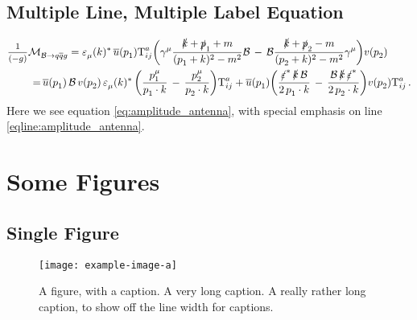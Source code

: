 \subsection{Multiple Line, Multiple Label Equation}

\begin{subequations} \begin{align}
		\mfrac{1}{(-g)} \mathcal{M}&\sub{\mathcal{B} \rightarrow q\overline{q}g }
		=
		\varepsilon\sub{\mu}(k)\upp{*} \,
		\overline{u}(p\sub{1})
		\textrm{T}\ind{a}{ij}
		\bigg(
		\gamma\upp{\mu}
		\frac{ \slashed{k} + \slashed{p}\sub{1} + m }{ (p\sub{1} + k)\upp{2} - m\upp{2} }
		\mathcal{B}
		\,-\,
		\mathcal{B}
		\frac{ \slashed{k} + \slashed{p}\sub{2} - m }{ (p\sub{2} + k)\upp{2} - m\upp{2} }
		\gamma\upp{\mu}
		\bigg)
		v(p\sub{2})
		\\
		=&\,
		\overline{u}(p\sub{1})
		\, \mathcal{B} \,
		v(p\sub{2}) \,
		\varepsilon\sub{\mu}(k)\upp{*} \,
		\bigg(
		\frac{ p\ind{\mu}{1} }{ p\sub{1}\cdot k }
		\,-\,
		\frac{ p\ind{\mu}{2} }{ p\sub{2}\cdot k }
		\bigg) \textrm{T}\ind{a}{ij}
		+ \overline{u}(p\sub{1})
		\bigg(
		\frac{ \slashed{\varepsilon}\upp{*} \, \slashed{k} \, \mathcal{B} }{ 2 \, p\sub{1}\cdot k }
		\,-\,
		\frac{ \mathcal{B} \, \slashed{k} \, \slashed{\varepsilon}\upp{*} }{ 2 \, p\sub{2}\cdot k }
		\bigg)
		v(p\sub{2})
		\textrm{T}\ind{a}{ij}
		\label{eqline:amplitude_antenna}
		\,.
\end{align} \label{eq:amplitude_antenna} 
\end{subequations}
%
Here we see equation \eqref{eq:amplitude_antenna}, with special emphasis on line \eqref{eqline:amplitude_antenna}.




\section{Some Figures}

\subsection{Single Figure}

\begin{figure}[!ht]
	\centering
	\texttt{[image: example-image-a]}
	\caption{A figure, with a caption. A very long caption. A really rather long caption, to show off the line width for captions.}
	\label{fig1:single_image}
\end{figure}


